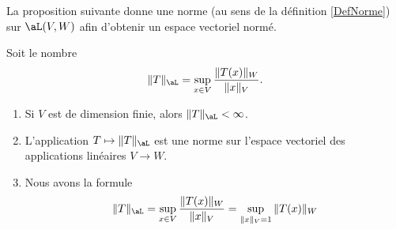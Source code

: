 La proposition suivante donne une norme (au sens de la définition \ref{DefNorme}) sur $\aL(V,W)$ afin d'obtenir un espace vectoriel normé.
\begin{proposition}		\label{PropNormeAppLineaire}
    Soit le nombre
	\begin{equation}
        \|T\|_{\aL}=\sup_{x\in V}\frac{\|T(x)\|_{W}}{\|x\|_{V}}.
	\end{equation}
    \begin{enumerate}
        \item
            Si \( V\) est de dimension finie, alors \( \| T \|_{\aL}<\infty\).
        \item
            L'application \( T\mapsto\| T \|_{\aL}\) est une norme sur l'espace vectoriel des applications linéaires \( V\to W\).
        \item
            Nous avons la formule
            \begin{equation}    \label{EqFZPooIoecGH}
                \| T \|_{\aL}=\sup_{x\in V}\frac{\|T(x)\|_{W}}{\|x\|_{V}} =\sup_{\|x\|_{V}=1}\|T(x)\|_{W}
            \end{equation}
    \end{enumerate}
\end{proposition}

